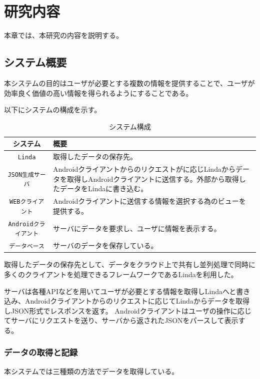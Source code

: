 \chapter{研究内容}
\label{chap:contents}

本章では、本研究の内容を説明する。

\section{システム概要}

本システムの目的はユーザが必要とする複数の情報を提供することで、ユーザが効率良く価値の高い情報を得られるようにすることである。

以下にシステムの構成を示す。

\begin{table}[htbp]
  \caption{システム構成}
  \label{tb:files}
  \begin{center}\begin{tabular}{|c|p{12cm}|}
    \hline
    システム&概要\\\hline\hline
    {\tt Linda}\cite{linda}&取得したデータの保存先。\\\hline
    {\tt JSON生成サーバ}&Androidクライアントからのリクエストがに応じLindaからデータを取得しAndroidクライアントに送信する。外部から取得したデータをLindaに書き込む。\\\hline
    {\tt WEBクライアント}&Androidクライアントに送信する情報を選択する為のビューを提供する。\\\hline
    {\tt Androidクライアント}&サーバにデータを要求し、ユーザに情報を表示する。\\\hline
    {\tt データベース}&サーバのデータを保存している。\\\hline
  \end{tabular}\end{center}
\end{table}

取得したデータの保存先として、データをクラウド上で共有し並列処理で同時に多くのクライアントを処理できるフレームワークであるLindaを利用した。

サーバは各種APIなどを用いてユーザが必要とする情報を取得しLindaへと書き込み、Androidクライアントからのリクエストに応じてLindaからデータを取得しJSON形式でレスポンスを返す。
Androidクライアントはユーザの操作に応じてサーバにリクエストを送り、サーバから返されたJSONをパースして表示する。

\subsection{データの取得と記録}
本システムでは三種類の方法でデータを取得している。

